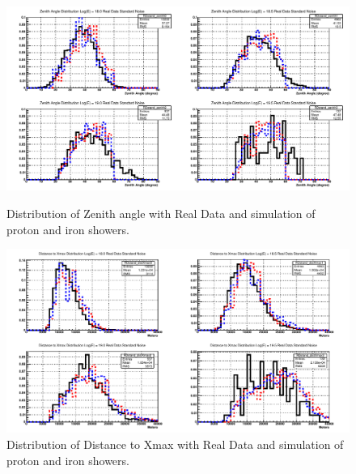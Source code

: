 \begin{figure}
\centering
\includegraphics[width=\textwidth]{chapters/graphs/SelectionEff/RealDataAndSim_ZenithDistComp.pdf}
\caption{Distribution of Zenith angle with Real Data and simulation of proton and iron showers.}
\vspace{3mm}
\includegraphics[width=\textwidth]{chapters/graphs/SelectionEff/RealDataAndSim_DistToXmaxDistComp.pdf}
\caption{Distribution of Distance to Xmax with Real Data and simulation of proton and iron showers.}
\end{figure}

